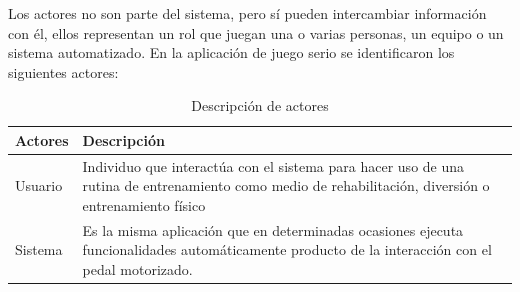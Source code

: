 Los actores no son parte del sistema, pero sí pueden intercambiar información con él, ellos representan un rol que juegan una o varias personas, un equipo o un sistema automatizado. En la aplicación de juego serio se identificaron los siguientes actores:

\begin{table}[h]
    \centering
    \begin{tabularx}{\textwidth}{|l|X|}
        \hline
        \textbf{Actores} & \textbf{Descripción} \\\hline
        Usuario & Individuo que interactúa con el sistema para hacer uso de una rutina de entrenamiento
        como medio de rehabilitación, diversión o entrenamiento físico \\\hline
        Sistema & Es la misma aplicación que en determinadas ocasiones ejecuta funcionalidades automáticamente producto de la interacción con el pedal motorizado. \\\hline
    \end{tabularx}
    \label{tab: actores}
    \caption{Descripción de actores}
\end{table}

